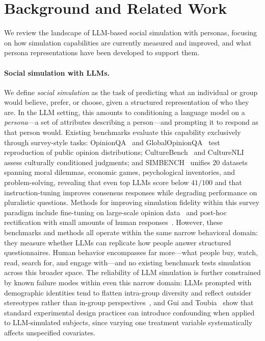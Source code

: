 \section{Background and Related Work}
\label{sec:related}

We review the landscape of LLM-based social simulation with personas, focusing on how simulation capabilities are currently measured and improved, and what persona representations have been developed to support them.

\paragraph{Social simulation with LLMs.}
We define \emph{social simulation} as the task of predicting what an individual or group would believe, prefer, or choose, given a structured representation of who they are.
In the LLM setting, this amounts to conditioning a language model on a \emph{persona}---a set of attributes describing a person---and prompting it to respond as that person would.
Existing benchmarks evaluate this capability exclusively through survey-style tasks:
OpinionQA~\cite{opinionqa} and GlobalOpinionQA~\cite{globalopinionqa} test reproduction of public opinion distributions;
CultureBench~\cite{culturebench} and CultureNLI~\cite{culturenli} assess culturally conditioned judgments;
and SIMBENCH~\cite{simbench} unifies $20$ datasets spanning moral dilemmas, economic games, psychological inventories, and problem-solving, revealing that even top LLMs score below $41/100$ and that instruction-tuning improves consensus responses while degrading performance on pluralistic questions.
Methods for improving simulation fidelity within this survey paradigm include fine-tuning on large-scale opinion data~\cite{suh_subpop_2025} and post-hoc rectification with small amounts of human responses~\cite{krsteski_valid_2025}.
However, these benchmarks and methods all operate within the same narrow behavioral domain: they measure whether LLMs can replicate how people answer structured questionnaires.
Human behavior encompasses far more---what people buy, watch, read, search for, and engage with---and no existing benchmark tests simulation across this broader space.
The reliability of LLM simulation is further constrained by known failure modes within even this narrow domain: LLMs prompted with demographic identities tend to flatten intra-group diversity and reflect outsider stereotypes rather than in-group perspectives~\cite{wang_flatten_2025}, and Gui and Toubia~\cite{gui_causal_2023} show that standard experimental design practices can introduce confounding when applied to LLM-simulated subjects, since varying one treatment variable systematically affects unspecified covariates.

